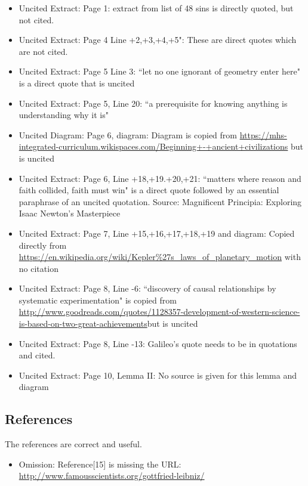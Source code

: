 \documentclass[11pt]{article}
\begin{document}
\begin{itemize}
\item Uncited Extract: Page 1: extract from list of 48 sins is directly quoted, but not cited.
\item Uncited Extract: Page 4 Line +2,+3,+4,+5": These are direct quotes which are not cited.
\item Uncited Extract: Page 5 Line 3: ``let no one ignorant of geometry enter here" is a direct quote that is uncited
\item Uncited Extract: Page 5, Line 20: ``a prerequisite for knowing anything is understanding why it is"
\item Uncited Diagram: Page 6, diagram: Diagram is copied from \url{https://mhs-integrated-curriculum.wikispaces.com/Beginning+-+ancient+civilizations} but is uncited
\item Uncited Extract: Page 6, Line +18,+19.+20,+21: ``matters where reason and faith collided, faith must win" is a direct quote followed by an essential paraphrase of an uncited quotation. Source: Magnificent Principia: Exploring Isaac Newton's Masterpiece
\item Uncited Extract: Page 7, Line +15,+16,+17,+18,+19 and diagram: Copied directly from \url{https://en.wikipedia.org/wiki/Kepler\%27s_laws_of_planetary_motion} with no citation
\item Uncited Extract: Page 8, Line -6: ``discovery of causal relationships by systematic experimentation" is copied from \url{http://www.goodreads.com/quotes/1128357-development-of-western-science-is-based-on-two-great-achievements}but is uncited
\item Uncited Extract: Page 8, Line -13: Galileo's quote needs to be in quotations and cited. 
\item Uncited Extract: Page 10, Lemma II: No source is given for this lemma and diagram
\end{itemize}

\subsection*{References}

The references are correct and useful.

\begin{itemize}
\item Omission: Reference[15] is missing the URL: \url{http://www.famousscientists.org/gottfried-leibniz/}
\end{itemize}
\end{document}
